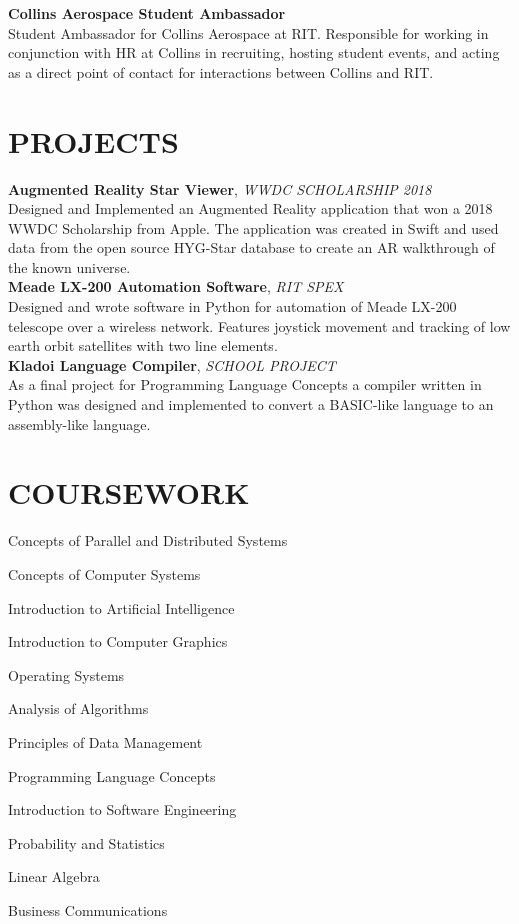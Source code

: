 \documentclass[line, resmargin]{res}
\begin{document}
\begin{resume}
\textbf{Collins Aerospace Student Ambassador}\\
Student Ambassador for Collins Aerospace at RIT.  Responsible for working in conjunction with HR at Collins in recruiting, hosting student events, and acting as a direct point of contact for interactions between Collins and RIT.
      
      
\section{PROJECTS}
\textbf{Augmented Reality Star Viewer}, \textit{WWDC SCHOLARSHIP 2018}\\
Designed and Implemented an Augmented Reality application that won a 2018 WWDC Scholarship from Apple.  The application was created in Swift and used data from the open source HYG-Star database to create an AR walkthrough of the known universe.
\\ [10pt]
\textbf{Meade LX-200 Automation Software}, \textit{RIT SPEX}\\
Designed and wrote software in Python for automation of Meade LX-200 telescope over a wireless network.  Features joystick movement and tracking of low earth orbit satellites with two line elements.
\\ [10pt]
\textbf{Kladoi Language Compiler}, \textit{SCHOOL PROJECT}\\
As a final project for Programming Language Concepts a compiler written in Python was designed and implemented to convert a BASIC-like language to an assembly-like language.


\section{COURSEWORK}
      \begin{enumerate*}[series=MyList, before=\hspace{-0.6ex}, label=\textbullet]
        \item Concepts of Parallel and Distributed Systems
        \item Concepts of Computer Systems
        \item Introduction to Artificial Intelligence
        \item Introduction to Computer Graphics
        \item Operating Systems
        \item Analysis of Algorithms
        \item Principles of Data Management
        \item Programming Language Concepts
        \item Introduction to Software Engineering
        \item Probability and Statistics
        \item Linear Algebra
        \item Business Communications
      \end{enumerate*}

 
\end{resume}
\end{document}
